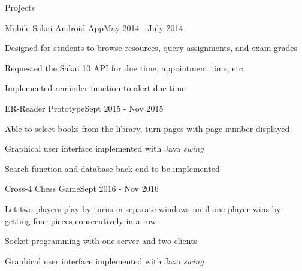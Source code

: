 \documentclass{resume} %
\begin{document}
\begin{rSection}{Projects}

	\begin{rSubsection}{Mobile Sakai Android App}{May 2014  - July 2014}{}{}
	\item Designed for students to browse resources, query assignments, and exam grades
	\item Requested the Sakai 10 API for due time, appointment time, etc.
	\item Implemented reminder function to alert due time
	\end{rSubsection}
	
	\begin{rSubsection}{ER-Reader Prototype}{Sept 2015 - Nov 2015}{}{}
		\item Able to select books from the library, turn pages with page number displayed
		\item Graphical user interface implemented with Java \textit{swing}
		\item Search function and database back end to be implemented
	\end{rSubsection}
	
	\begin{rSubsection}{Cross-4 Chess Game}{Sept 2016 - Nov 2016}{}{}
		\item Let two players play by turns in separate windows until one player wins by getting four pieces consecutively in a row 
		\item Socket programming with one server and two clients
		\item Graphical user interface implemented with Java \textit{swing}		
	\end{rSubsection}

\end{rSection}
\end{document}
